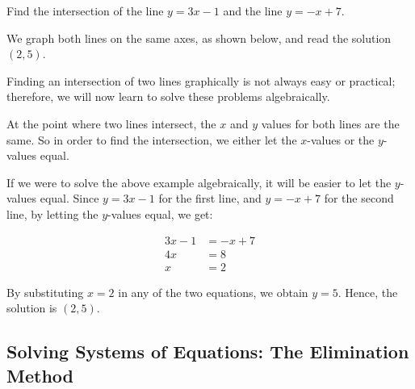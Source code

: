 \begin{example}
Find the intersection of the line $y = 3x - 1$ and the line $y = -x + 7$.
\end{example}

\begin{solution}
We graph both lines on the same axes, as shown below, and read the solution $(2, 5)$.
\begin{center}
\end{center}

Finding an intersection of two lines graphically is not always easy or practical; therefore, we will now learn to solve these problems algebraically.

At the point where two lines intersect, the $x$ and $y$ values for both lines are the same. So in order to find the intersection, we either let the $x$-values or the $y$-values equal.

If we were to solve the above example algebraically, it will be easier to let the $y$-values equal. Since $y = 3x - 1$ for the first line, and $y = -x + 7$ for the second line, by letting the $y$-values equal, we get:

\begin{align*}
3x - 1 &= -x + 7 \\
4x &= 8 \\
x &= 2
\end{align*}

By substituting $x = 2$ in any of the two equations, we obtain $y = 5$. Hence, the solution is $(2, 5)$.
\end{solution}


\subsection{Solving Systems of Equations: The Elimination Method}

